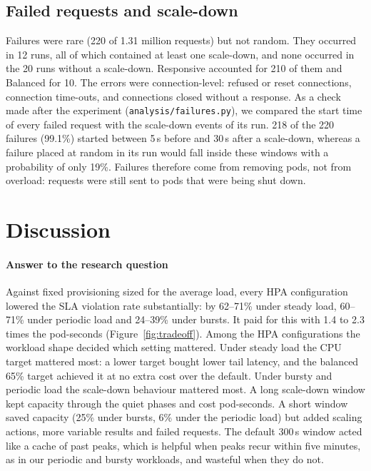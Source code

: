 \documentclass[conference,a4paper]{IEEEtran}
\begin{document}
\subsection{Failed requests and scale-down}
\label{sec:failures}
Failures were rare (220 of 1.31 million requests) but not random. They
occurred in 12 runs, all of which contained at least one scale-down, and none
occurred in the 20 runs without a scale-down. Responsive accounted for 210 of
them and Balanced for 10. The errors were connection-level: refused or reset
connections, connection time-outs, and connections closed without a response.
As a check made after the experiment (\texttt{analysis/failures.py}), we
compared the start time of every failed request with the scale-down events of
its run. 218 of the 220 failures (99.1\%) started between 5\,s before and 30\,s
after a scale-down, whereas a failure placed at random in its run would fall
inside these windows with a probability of only 19\%. Failures therefore come from removing pods, not from
overload: requests were still sent to pods that were being shut down.

\section{Discussion}
\label{sec:discussion}

\paragraph{Answer to the research question}
Against fixed provisioning sized for the average load, every HPA
configuration lowered the SLA violation rate substantially: by 62--71\% under
steady load, 60--71\% under periodic load and 24--39\% under bursts. It paid for
this with 1.4 to 2.3 times the pod-seconds (Figure~\ref{fig:tradeoff}). Among
the HPA configurations the workload shape decided which setting mattered. Under
steady load the CPU target mattered most: a lower target bought lower tail
latency, and the balanced 65\% target achieved it at no extra cost over the
default. Under bursty and periodic load the scale-down behaviour mattered most.
A long scale-down window kept capacity through the quiet phases and cost
pod-seconds. A short window saved capacity (25\% under bursts, 6\% under the
periodic load) but added scaling actions, more variable results and failed
requests. The default 300\,s window acted like a cache of past peaks, which is
helpful when peaks recur within five minutes, as in our periodic and bursty
workloads, and wasteful when they do not.
\end{document}
